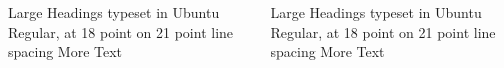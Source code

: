 \documentclass[final,hyperref={pdfpagelabels=false}]{beamer}
\begin{document}
\begin{frame}{}
\begin{columns}[T] %
\begin{column}{.43\paperwidth} %

\begin{block}{Large Headings typeset in Ubuntu Regular, at 18 point on 21 point line spacing}
More Text \blindtext
\end{block}

\end{column}
\begin{column}{.43\paperwidth} %


\begin{block}{Large Headings typeset in Ubuntu Regular, at 18 point on 21 point line spacing}
More Text \blindtext
\end{block}

\end{column}
\end{columns}

\end{frame}
\end{document}
